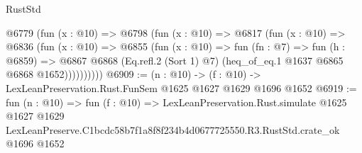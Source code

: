 \begin{lexlean}{RustStd}
\begin{coremodule}
          @6779
            (fun (x : @10) =>
            @6798
              (fun (x : @10) =>
              @6817
                (fun (x : @10) =>
                @6836
                  (fun (x : @10) =>
                  @6855
                    (fun (x : @10) =>
                    fun (fn : @7) =>
                    fun (h : @6859) =>
                    @6867
                      @6868
                      (Eq.refl.{2} (Sort 1) @7)
                      (heq_of_eq.{1} @1637 @6865 @6868 @1652))))))))))
@6909 := (n : @10) -> (f : @10) -> LexLeanPreservation.Rust.FunSem @1625 @1627 @1629 @1696 @1652
@6919 := fun (n : @10) =>
  fun (f : @10) =>
  LexLeanPreservation.Rust.simulate
    @1625
    @1627
    @1629
    LexLeanPreserve.C1bcdc58b7f1a8f8f234b4d0677725550.R3.RustStd.crate_ok
    @1696
    @1652
\end{coremodule}
\end{lexlean}
